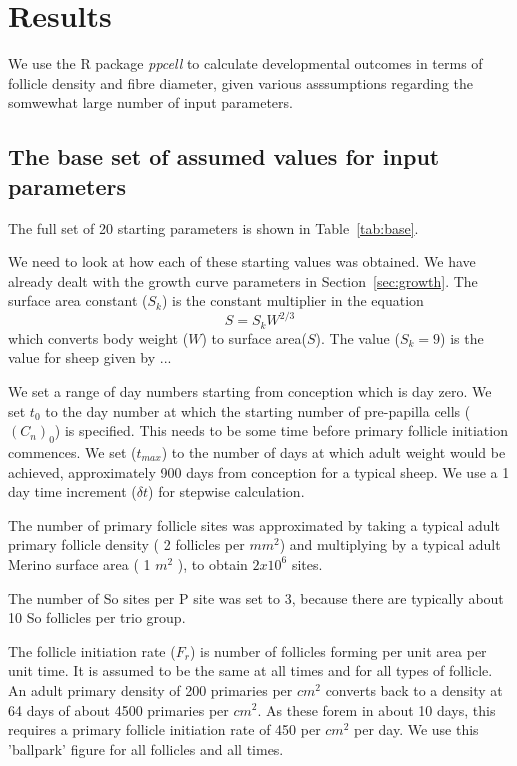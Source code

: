 \documentclass[titlepage]{article}  %
\begin{document}
\section{Results}
We use the R package {\em ppcell} to calculate developmental outcomes in terms of follicle density and fibre diameter, given various asssumptions regarding the somwewhat large number of input parameters.

\subsection{The base set of assumed values for input parameters}
The full set of 20 starting parameters is shown in Table~\ref{tab:base}.

We need to look at how each of these starting values was obtained. We have already dealt with the growth curve parameters in Section~\ref{sec:growth}. The surface area constant ($S_{k}$) is the constant multiplier in the equation
\begin{displaymath}
S = S_{k} W^{2/3}
\end{displaymath}
which converts body weight ($W$) to surface area($S$).  The value ($S_{k} = 9$) is the value for sheep given by ...

 We set a range of day numbers starting from conception which is day zero.  We set $t_{0}$ to the day number at which the starting number of pre-papilla cells ($(C_{n})_{0}$) is specified. This needs to be some time before primary follicle initiation commences. We set ($t_{max}$)  to the number of days at which adult weight would be achieved, approximately 900 days from conception for a typical sheep. We use a 1 day time increment ($\delta t$) for stepwise calculation.

 The number of primary follicle sites was approximated by taking a typical adult primary follicle density ( 2 follicles per $mm^{2}$) and multiplying by a typical adult Merino surface area ( 1 $m^{2}$ ), to obtain $2 x 10^{6}$ sites.

 The number of So sites per P site was set to 3, because there are typically about 10 So follicles per trio group. 

 The follicle initiation rate ($F_{r}$) is number of follicles forming per unit area per unit time. It is assumed to be the same at all times and for all types of follicle.  An adult primary density of 200 primaries per $cm^{2}$ converts back to a density at 64 days of about 4500 primaries per $cm^{2}$. As these forem in about 10 days, this requires a primary follicle initiation rate of 450 per $cm^{2}$ per day. We use this 'ballpark' figure for all follicles and all times.
\end{document}
